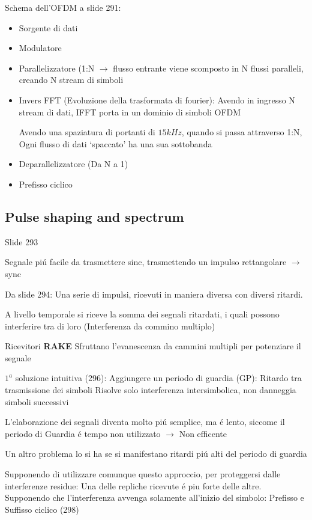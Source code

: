 \documentclass{article}
\begin{document}
Schema dell'OFDM a slide 291:
\begin{itemize}
    \item Sorgente di dati
    \item Modulatore
    \item Parallelizzatore (1:N $\rightarrow$ flusso entrante viene scomposto in N flussi paralleli, creando N stream di simboli
    \item Invers FFT (Evoluzione della trasformata di fourier): Avendo in ingresso N stream di dati, IFFT porta in un dominio di simboli OFDM

        Avendo una spaziatura di portanti di $15kHz$, quando si passa attraverso 1:N, Ogni flusso di dati `spaccato' ha una sua sottobanda
    \item Deparallelizzatore (Da N a 1)
    \item Prefisso ciclico
\end{itemize}


\subsection{Pulse shaping and spectrum}
Slide 293

Segnale pi\'u facile da trasmettere sinc, trasmettendo un impulso rettangolare $\rightarrow$ sync

Da slide 294: Una serie di impulsi, ricevuti in maniera diversa con diversi ritardi.

A livello temporale si riceve la somma dei segnali ritardati, i quali possono interferire tra di loro (Interferenza da commino multiplo)

Ricevitori \textbf{RAKE} Sfruttano l'evanescenza da cammini multipli per potenziare il segnale

$1^a$ soluzione intuitiva (296): Aggiungere un periodo di guardia (GP): Ritardo tra trasmissione dei simboli
Risolve solo interferenza intersimbolica, non danneggia simboli successivi

L'elaborazione dei segnali diventa molto pi\'u semplice, ma \'e lento, siccome il periodo di Guardia \'e tempo non utilizzato $\rightarrow$ Non efficente

Un altro problema lo si ha se si manifestano ritardi pi\'u alti del periodo di guardia


Supponendo di utilizzare comunque questo approccio, per proteggersi dalle interferenze residue: Una delle repliche ricevute \'e piu forte delle altre. Supponendo che l'interferenza avvenga solamente all'inizio del simbolo: Prefisso e Suffisso ciclico (298)
\end{document}
